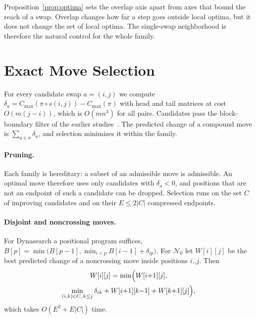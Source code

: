 \documentclass{article}
\newcommand{\N}{\mathcal{N}}
\begin{document}
Proposition~\ref{prop:optima} sets the overlap axis apart from axes that
bound the reach of a swap. Overlap changes how far a step goes outside
local optima, but it does not change the set of local optima. The
single-swap neighborhood is therefore the natural control for the whole
family.

\section{Exact Move Selection}\label{sec:selection}

For every candidate swap $a=(i,j)$ we compute
$\delta_a=C_{\max}(\pi\circ s(i,j))-C_{\max}(\pi)$ with head and tail
matrices at cost $O(m(j-i))$, which is $O(mn^3)$ for all pairs.
Candidates pass the block-boundary filter of the earlier
studies~\cite{windowed_own}. The predicted change of a compound move is
$\sum_{a\in\sigma}\delta_a$, and selection minimizes it within the
family.

\paragraph{Pruning.} Each family is hereditary: a subset of an
admissible move is admissible. An optimal move therefore uses only
candidates with $\delta_a<0$, and positions that are not an endpoint of
such a candidate can be dropped. Selection runs on the set $C$ of
improving candidates and on their $E\leq 2|C|$ compressed endpoints.

\paragraph{Disjoint and noncrossing moves.} For Dynasearch a positional
program suffices,
$B[p]=\min\bigl(B[p-1],\min_{i<p}B[i-1]+\delta_{ip}\bigr)$. For $\N_0$
let $W[i][j]$ be the best predicted change of a noncrossing move inside
positions $i..j$. Then
\begin{multline}\label{eq:interval}
W[i][j]=\min\Bigl(W[i{+}1][j],\\ \min_{(i,k)\in C,\,k\leq j}
\delta_{ik}+W[i{+}1][k{-}1]+W[k{+}1][j]\Bigr),
\end{multline}
which takes $O(E^2+E|C|)$ time.
\end{document}
